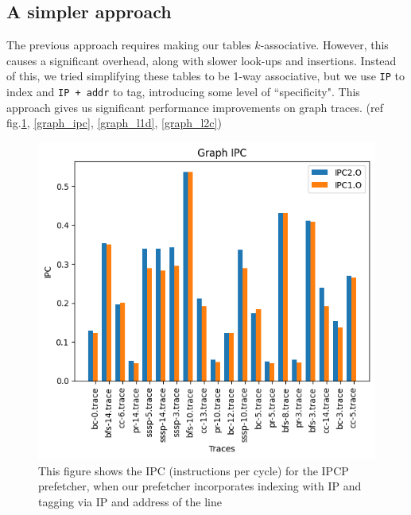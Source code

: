 \documentclass[conference]{IEEEtran}
\begin{document}
\subsection{A simpler approach}
The previous approach requires making our tables $k$-associative. However, this causes a significant overhead, along with slower look-ups and insertions. Instead of this, we tried simplifying these tables to be 1-way associative, but we use \verb|IP| to index and \verb|IP + addr| to tag, introducing some level of ``specificity". This approach gives us significant performance improvements on graph traces. (ref fig.\ref{graph_rel_ipc}, \ref{graph_ipc}, \ref{graph_l1d}, \ref{graph_l2c})
\begin{figure}
\includegraphics[scale=0.5]{Images/graph_ipc_bar.png}
\caption{This figure shows the IPC (instructions per cycle) for the IPCP prefetcher, when our prefetcher incorporates indexing with IP and tagging via IP and address of the line}
\label{graph_rel_ipc}
\end{figure}
\end{document}
